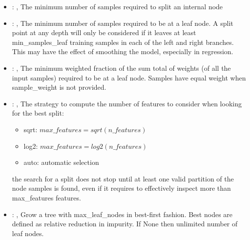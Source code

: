 \begin{itemize}
    \item {}: , 
      The minimum number of samples required to split an internal node

    \item {}: , 
      The minimum number of samples required to be at a leaf node. A split point at any
      depth will only be considered if it leaves at least min\_samples\_leaf training samples in
      each                                                  of the left and right branches. This may
      have the effect of smoothing the model, especially
      in regression.

    \item {}: , 
      The minimum weighted fraction of the sum total of weights (of all the input samples)
      required to be at a leaf node. Samples have equal weight when sample\_weight is not provided.

    \item {}: , 
      The strategy to compute the number of features to consider when looking for the best split:
      \begin{itemize}                                                     \item sqrt:
      $max\_features=sqrt(n\_features)$                                                     \item
      log2: $max\_features=log2(n\_features)$
      \item auto: automatic selection
      \end{itemize}                                                   \nb the search for a split
      does not stop until at least one valid partition of the node
      samples is found, even if it requires to effectively inspect more than max\_features features.

    \item {}: , 
      Grow a tree with max\_leaf\_nodes in best-first fashion. Best nodes are defined as relative
      reduction                                                  in impurity. If None then unlimited
      number of leaf nodes.


\end{itemize}
